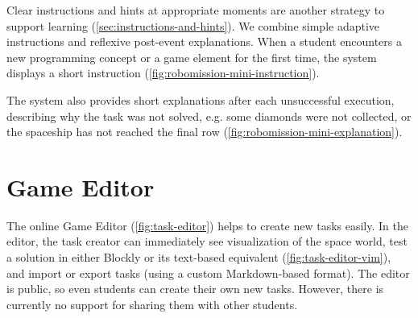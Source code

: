 Clear instructions and hints at appropriate moments
are another strategy to support learning
(\cref{sec:instructions-and-hints}).
We combine simple adaptive instructions and reflexive post-event explanations.
When a student encounters a new programming concept or a game element
for the first time, the system displays a short instruction
(\cref{fig:robomission-mini-instruction}).


The system also provides short explanations after each unsuccessful execution,
describing why the task was not solved,
e.g. some diamonds were not collected,
or the spaceship has not reached the final row
(\cref{fig:robomission-mini-explanation}).


\section{Game Editor}  %
\label{sec:robomission.task-editor}

The online Game Editor (\cref{fig:task-editor})
helps to create new tasks easily.
In the editor, the task creator can immediately see visualization of the space world,
test a solution in either Blockly or its text-based equivalent %
(\cref{fig:task-editor-vim}),
and import or export tasks (using a custom Markdown-based format).
The editor is public, so even students can create their own new tasks.
However, there is currently no support for sharing them with other students.



